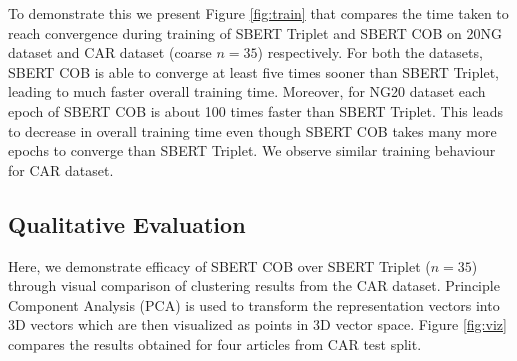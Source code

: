 \documentclass[11pt,a4paper]{article}
\begin{document}
To demonstrate this we present Figure \ref{fig:train} that compares the time taken to reach convergence during training of SBERT Triplet and SBERT COB on 20NG dataset and CAR dataset (coarse $n=35$) respectively. For both the datasets, SBERT COB is able to converge at least five times sooner than SBERT Triplet, leading to much faster overall training time. Moreover, for NG20 dataset each epoch of SBERT COB is about 100 times faster than SBERT Triplet. This leads to decrease in overall training time even though SBERT COB takes many more epochs to converge than SBERT Triplet. We observe similar training behaviour for CAR dataset.


\subsection{Qualitative Evaluation} Here, we demonstrate efficacy of SBERT COB over SBERT Triplet ($n=35$) through visual comparison of clustering results from the CAR dataset. Principle Component Analysis (PCA) is used to transform the representation vectors into 3D vectors which are then visualized as points in 3D vector space. Figure \ref{fig:viz} compares the results obtained for four articles from CAR test split.
\end{document}
